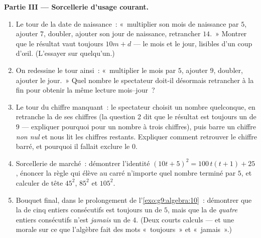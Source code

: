 \begin{problem}
\medskip
\noindent\textbf{Partie III --- Sorcellerie d'usage courant.}
\begin{enumerate}[resume]
  \item Le tour de la date de naissance~: «~multiplier son mois de
        naissance par $5$, ajouter $7$, doubler, ajouter son jour de
        naissance, retrancher $14$.~» Montrer que le résultat vaut
        toujours $10m + d$ --- le mois et le jour, lisibles d'un
        coup d'œil. (L'essayer sur quelqu'un.)
  \item On redessine le tour ainsi~: «~multiplier le mois par $5$,
        ajouter $9$, doubler, ajouter le jour.~» Quel nombre le
        spectateur doit-il désormais retrancher à la fin pour
        obtenir la même lecture mois--jour~?
  \item Le tour du chiffre manquant~: le spectateur choisit un
        nombre quelconque, en retranche la  de ses chiffres (la
        question 2 dit que le résultat est toujours un  de
        $9$ --- expliquer pourquoi pour un nombre à trois chiffres),
        puis barre un chiffre \emph{non nul} et nous lit les
        chiffres restants. Expliquer comment retrouver le chiffre
        barré, et pourquoi il fallait exclure le $0$.
  \item Sorcellerie de marché~: démontrer l'identité
        $(10t + 5)^2 = 100\,t(t+1) + 25$, énoncer la règle qui
        élève au carré n'importe quel nombre terminé par $5$, et
        calculer de tête $45^2$, $85^2$ et $105^2$.
  \item Bouquet final, dans le prolongement de
        l'\cref{exo:g9:algebra:10}~: démontrer que la  de cinq
        entiers consécutifs est toujours un  de $5$, mais
        que la  de \emph{quatre} entiers consécutifs n'est
        \emph{jamais} un  de $4$. (Deux courts calculs ---
        et une morale sur ce que l'algèbre fait des mots
        «~toujours~» et «~jamais~».)
\end{enumerate}
\end{problem}
